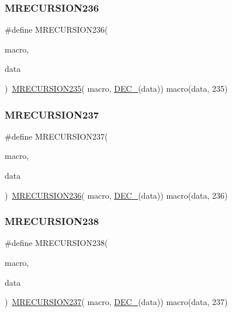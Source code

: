 \subsubsection{\texorpdfstring{MRECURSION236}{MRECURSION236}}
{\footnotesize\ttfamily \#define M\+R\+E\+C\+U\+R\+S\+I\+O\+N236(\begin{DoxyParamCaption}\item[{}]{macro,  }\item[{}]{data }\end{DoxyParamCaption})~\mbox{\hyperlink{group__group__sam0__utils__mrecursion_gaa7d5430690e1370d6f49a1e6378b6afb}{M\+R\+E\+C\+U\+R\+S\+I\+O\+N235}}(  macro, \mbox{\hyperlink{group__group__sam0__utils__mrecursion_ga1d23d683797679dca8c3512a54a5dcae}{D\+E\+C\+\_\+}}(data))   macro(data, 235)}

\mbox{\label{group__group__sam0__utils__mrecursion_gab9258aa3f5d03304ea107256779c5f8d}} 
\subsubsection{\texorpdfstring{MRECURSION237}{MRECURSION237}}
{\footnotesize\ttfamily \#define M\+R\+E\+C\+U\+R\+S\+I\+O\+N237(\begin{DoxyParamCaption}\item[{}]{macro,  }\item[{}]{data }\end{DoxyParamCaption})~\mbox{\hyperlink{group__group__sam0__utils__mrecursion_gac42f885ee78a99d9b0ea05eee47744f7}{M\+R\+E\+C\+U\+R\+S\+I\+O\+N236}}(  macro, \mbox{\hyperlink{group__group__sam0__utils__mrecursion_ga1d23d683797679dca8c3512a54a5dcae}{D\+E\+C\+\_\+}}(data))   macro(data, 236)}

\mbox{\label{group__group__sam0__utils__mrecursion_gaded5f696adc611ccbf8aa9a4b8841a24}} 
\subsubsection{\texorpdfstring{MRECURSION238}{MRECURSION238}}
{\footnotesize\ttfamily \#define M\+R\+E\+C\+U\+R\+S\+I\+O\+N238(\begin{DoxyParamCaption}\item[{}]{macro,  }\item[{}]{data }\end{DoxyParamCaption})~\mbox{\hyperlink{group__group__sam0__utils__mrecursion_gab9258aa3f5d03304ea107256779c5f8d}{M\+R\+E\+C\+U\+R\+S\+I\+O\+N237}}(  macro, \mbox{\hyperlink{group__group__sam0__utils__mrecursion_ga1d23d683797679dca8c3512a54a5dcae}{D\+E\+C\+\_\+}}(data))   macro(data, 237)}


